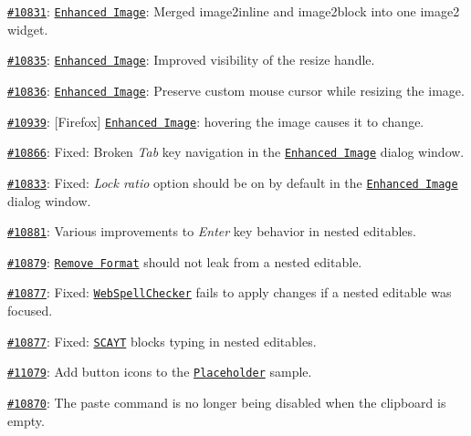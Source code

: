 {\ttfamily 
\begin{DoxyItemize}
\item \href{http://dev.ckeditor.com/ticket/10831}{\tt \#10831}\+: \href{http://ckeditor.com/addon/image2}{\tt Enhanced Image}\+: Merged {\ttfamily image2inline} and {\ttfamily image2block} into one {\ttfamily image2} widget.
\item \href{http://dev.ckeditor.com/ticket/10835}{\tt \#10835}\+: \href{http://ckeditor.com/addon/image2}{\tt Enhanced Image}\+: Improved visibility of the resize handle.
\item \href{http://dev.ckeditor.com/ticket/10836}{\tt \#10836}\+: \href{http://ckeditor.com/addon/image2}{\tt Enhanced Image}\+: Preserve custom mouse cursor while resizing the image.
\item \href{http://dev.ckeditor.com/ticket/10939}{\tt \#10939}\+: \mbox{[}Firefox\mbox{]} \href{http://ckeditor.com/addon/image2}{\tt Enhanced Image}\+: hovering the image causes it to change.
\item \href{http://dev.ckeditor.com/ticket/10866}{\tt \#10866}\+: Fixed\+: Broken {\itshape Tab} key navigation in the \href{http://ckeditor.com/addon/image2}{\tt Enhanced Image} dialog window.
\item \href{http://dev.ckeditor.com/ticket/10833}{\tt \#10833}\+: Fixed\+: {\itshape Lock ratio} option should be on by default in the \href{http://ckeditor.com/addon/image2}{\tt Enhanced Image} dialog window.
\item \href{http://dev.ckeditor.com/ticket/10881}{\tt \#10881}\+: Various improvements to {\itshape Enter} key behavior in nested editables.
\item \href{http://dev.ckeditor.com/ticket/10879}{\tt \#10879}\+: \href{http://ckeditor.com/addon/removeformat}{\tt Remove Format} should not leak from a nested editable.
\item \href{http://dev.ckeditor.com/ticket/10877}{\tt \#10877}\+: Fixed\+: \href{http://ckeditor.com/addon/wsc}{\tt Web\+Spell\+Checker} fails to apply changes if a nested editable was focused.
\item \href{http://dev.ckeditor.com/ticket/10877}{\tt \#10877}\+: Fixed\+: \href{http://ckeditor.com/addon/wsc}{\tt S\+C\+A\+YT} blocks typing in nested editables.
\item \href{http://dev.ckeditor.com/ticket/11079}{\tt \#11079}\+: Add button icons to the \href{http://ckeditor.com/addon/placeholder}{\tt Placeholder} sample.
\item \href{http://dev.ckeditor.com/ticket/10870}{\tt \#10870}\+: The {\ttfamily paste} command is no longer being disabled when the clipboard is empty.

\end{DoxyItemize}}
